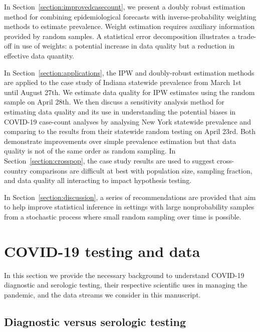 \documentclass[12pt]{amsart}
\numberwithin{equation}{section}
\theoremstyle{plain}
\begin{document}
In Section~\ref{section:improvedcasecount}, we present a doubly robust estimation method for combining epidemiological forecasts with inverse-probability weighting methods to estimate prevalence.  Weight estimation requires auxiliary information provided by random samples.  A statistical error decomposition illustrates a trade-off in use of weights: a potential increase in data quality but a reduction in effective data quantity.

In Section~\ref{section:applications}, the IPW and doubly-robust estimation methods are applied to the case study of Indiana statewide prevalence from March 1st until August 27th.  We estimate data quality for IPW estimates using the random sample on April 28th.  We then discuss a sensitivity analysis method for estimating data quality and its use in understanding the potential biases in COVID-19 case-count analyses by analysing New York statewide prevalence and comparing to the results from their statewide random testing on April 23rd.  Both demonstrate improvements over simple prevalence estimation but that data quality is not of the same order as random sampling.  In Section~\ref{section:crosspop}, the case study results are used to suggest cross-country comparisons are difficult at best with population size, sampling fraction, and data quality all interacting to impact hypothesis testing.

In Section~\ref{section:discussion}, a series of recommendations are provided that aim to help improve statistical inference in settings with large nonprobability samples from a stochastic process where small random sampling over time is possible.

\section{COVID-19 testing and data}
\label{section:data}

In this section we provide the necessary background to understand COVID-19 diagnostic and serologic testing, their respective scientific uses in managing the pandemic, and the data streams we consider in this manuscript.

\subsection{Diagnostic versus serologic testing}
\label{section:testinginfo}

\end{document}
